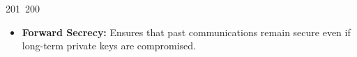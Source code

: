 201~200~\documentclass{article}
\begin{document}
	                                                                                                                                                                                                                                                                                                	                                                                                                                                        	    	                                                                                                	                                                                                                                                                                                                                                                                                                                                	                                                                        	                                                                        	                                                                                                                                        	                                                                                                                                                                        \begin{itemize}
	                                                                                                                                                                                                                                                                                                	                                                                                                                                        	    	                                                                                                	                                                                                                                                                                                                                                                                                                                                	                                                                        	                                                                        	                                                                                                                                        	                                                                                                                                                                            \item \textbf{Forward Secrecy:} Ensures that past communications remain secure even if long-term private keys are compromised.

\end{itemize}
\end{document}
